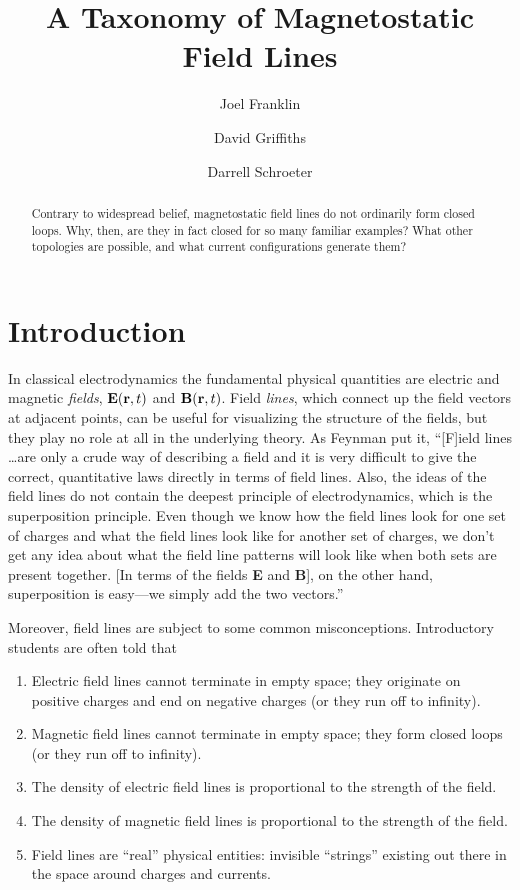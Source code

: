 \documentclass[aps,prb,twocolumn,groupedaddress,noshowpacs,checklength,amsmath]{revtex4-1}
\begin{document}
\title{A Taxonomy of Magnetostatic Field Lines}

\author{Joel Franklin}
\author{David Griffiths}
\author{Darrell Schroeter}

\begin{abstract}  
Contrary to widespread belief, magnetostatic field lines do not ordinarily form closed loops.  Why, then, are they in fact closed for so many familiar examples?  What other topologies are possible, and what current configurations generate them?
\end{abstract}

\maketitle

\section{Introduction} 
In classical electrodynamics the fundamental physical quantities are electric and magnetic {\it fields}, ${\bf E}({\bf r},t)$ and ${\bf B}({\bf r},t)$.  Field {\it lines},\cite{AFL} which connect up the field vectors at adjacent points, can be useful for visualizing the structure of the fields, but they play no role at all in the underlying theory.  As Feynman put it, ``[F]ield lines \ldots are only a crude way of describing a field and it is very difficult to give the correct, quantitative laws directly in terms of field lines.  Also, the ideas of the field lines do not contain the deepest principle of electrodynamics, which is the superposition principle.  Even though we know how the field lines look for one set of charges and what the field lines look like for another set of charges, we don't get any idea about what the field line patterns will look like when both sets are present together.  [In terms of the fields {\bf E} and {\bf B}], on the other hand, superposition is easy---we simply add the two vectors.''\cite{SIME}  

Moreover, field lines are subject to some common misconceptions.  Introductory students are often told that
\begin{enumerate}
\item Electric field lines cannot terminate in empty space; they originate on positive charges and end on negative charges (or they run off to infinity).
\item Magnetic field lines cannot terminate in empty space; they form closed loops (or they run off to infinity).
\item The density of electric field lines is proportional to the strength of the field.
\item The density of magnetic field lines is proportional to the strength of the field.
\item Field lines are ``real'' physical entities: invisible ``strings'' existing out there in the space around charges and currents.
\end{enumerate}
\end{document}
